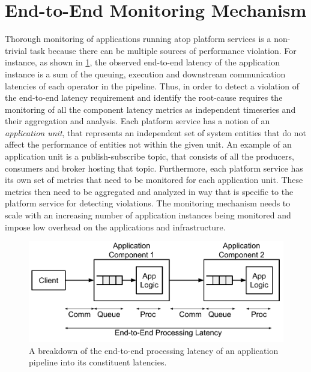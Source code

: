 \section{End-to-End Monitoring Mechanism}
Thorough monitoring of applications running atop platform services is a non-trivial task because there can be multiple sources of performance violation. For instance, as shown in \cref{fig:pipeline_latencies}, the observed end-to-end latency of the application instance is a sum of the queuing, execution and downstream communication latencies of each operator in the pipeline.  Thus, in order to detect a violation of the end-to-end latency requirement and identify the root-cause requires the monitoring of all the component latency metrics as independent timeseries and their aggregation and analysis. Each platform service has a notion of an \textit{application unit}, that represents an independent set of system entities that do not affect the performance of entities not within the given unit. An example of an application unit is a publish-subscribe topic, that consists of all the producers, consumers and broker hosting that topic. Furthermore, each platform service has its own set of metrics that need to be monitored for each application unit. These metrics then need to be aggregated and analyzed in way that is specific to the platform service for detecting violations. The monitoring mechanism needs to scale with an increasing number of application instances being monitored and impose low overhead on the applications and infrastructure.
\begin{figure}
\centering
\includegraphics[width=0.75\linewidth]{figures/mechanisms/monitoring/pipeline_latencies}
\caption{A breakdown of the end-to-end processing latency of an application pipeline into its constituent latencies.}
\label{fig:pipeline_latencies}
\end{figure}

